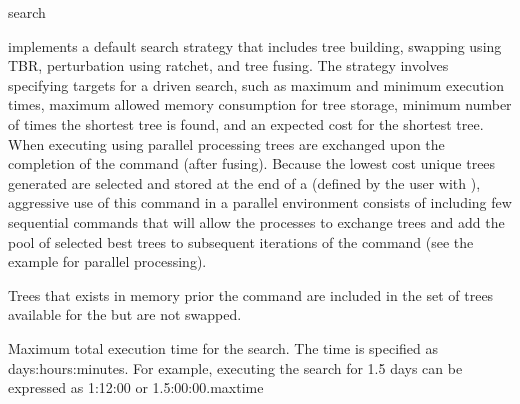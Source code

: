 \begin{command}{search}{}


	\begin{poydescription}
             implements a default search strategy that
            includes tree building, swapping using TBR, perturbation using
            ratchet, and tree fusing. The strategy involves specifying targets for 
            a driven search, such as maximum and minimum execution times, 
            maximum allowed memory consumption for tree storage, minimum number of times the
            shortest tree is found, and an expected cost for the shortest tree.  When executing
              using parallel processing trees are exchanged upon the
              completion of the command (after fusing).  Because the lowest cost unique trees 
              generated are selected and stored at the end of a  
              (defined by the user with ), aggressive use of this 
              command in a parallel environment consists of including few sequential
                commands that will allow the processes to
               exchange trees and add the pool of selected
               best trees to subsequent iterations of the command (see the example for parallel processing).

               Trees that exists in memory prior the  command
               are included in the set of trees available for the
                but are not swapped.
	\end{poydescription}

	\begin{arguments}


        	      
        
        {Maximum total execution time for the search. The time is specified as
        days:hours:minutes. For example, executing the search for 1.5 days can
        be expressed as 1:12:00 or 1.5:00:00.}{maxtime}
        

\end{arguments}
\end{command}
